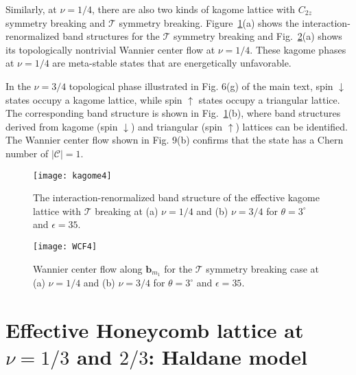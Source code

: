 \documentclass[aps,prl,floatfix,twocolumn]{revtex4-1}
\begin{document}
Similarly, at $ \nu=1/4 $, there are also two kinds of kagome lattice with $ C_{2z} $ symmetry breaking and $ \mathcal{T} $ symmetry breaking. Figure~\ref{fig:kagome4}(a) shows the interaction-renormalized band structures for the $ \mathcal{T} $ symmetry breaking and Fig.~\ref{fig:WCF4}(a) shows its topologically nontrivial Wannier center flow at $ \nu=1/4 $. These kagome phases at $\nu=1/4$ are meta-stable states that are energetically unfavorable.

In the $\nu=3/4$ topological phase illustrated in Fig. 6(g) of the main text, spin $\downarrow$ states occupy a kagome lattice, while spin $\uparrow$ states occupy a triangular lattice. The corresponding band structure is shown  in Fig.~\ref{fig:kagome4}(b), where band structures derived from kagome (spin $\downarrow$) and triangular (spin $\uparrow$) lattices can be identified. The Wannier center flow shown in Fig. 9(b) confirms that the state has a Chern number of $|\mathcal{C}|=1$.


\begin{figure}[t]
	\centering
	\texttt{[image: kagome4]}
	\caption{The interaction-renormalized band structure of the effective kagome lattice with $ \mathcal{T} $ breaking at (a) $ \nu=1/4 $ and (b) $ \nu=3/4 $ for $ \theta=3^\circ $ and $ \epsilon=35 $.}
	\label{fig:kagome4}
\end{figure}

\begin{figure}[t]
	\centering
	\texttt{[image: WCF4]}
	\caption{Wannier center flow along $ \bm{b}_{m_1} $ for the $ \mathcal{T} $ symmetry breaking case at (a) $ \nu=1/4 $ and (b) $ \nu=3/4 $ for $ \theta=3^\circ $ and $ \epsilon=35 $.}
	\label{fig:WCF4}
\end{figure}

\section{Effective Honeycomb lattice at $ \nu=1/3 $ and $ 2/3 $: Haldane model}
\end{document}
